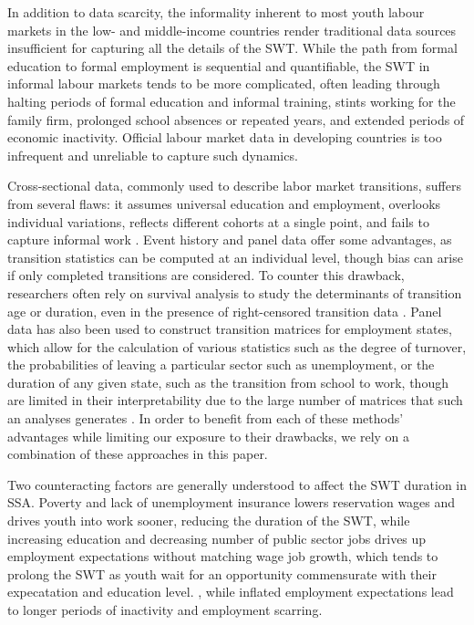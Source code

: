 \documentclass[
  a4paper, twoside, 12pt]{book}
\renewcommand{\hl}[1]{#1}
\newcommand{\hlc}[2][color]{}
\begin{document}
\hlc[pink]{The dynamic process of the school-to-work transition (SWT), including all the activities of young people between full-time schooling and stable employment, can only be fully captured with detailed, longitudinal data; as a result, most studies of SWT dynamics to date have been conducted in high-income countries (HICs).} In addition to data scarcity, the informality inherent to most youth labour markets in the low- and middle-income countries render traditional data sources insufficient for capturing all the details of the SWT. While the path from formal education to formal employment is sequential and quantifiable, the SWT in informal labour markets tends to be more complicated, often leading through halting periods of formal education and informal training, stints working for the family firm, prolonged school absences or repeated years, and extended periods of economic inactivity. Official labour market data in developing countries is too infrequent and unreliable to capture such dynamics.

\hl{Cross-sectional data, commonly used to describe labor market transitions, suffers from several flaws: it assumes universal education and employment, overlooks individual variations, reflects different cohorts at a single point, and fails to capture informal work} \autocite{nilsson2019}. \hl{Event history and panel data offer some advantages, as transition statistics can be computed at an individual level, though bias can arise if only completed transitions are considered. To counter this drawback, researchers often rely on survival analysis to study the determinants of transition age or duration, even in the presence of right-censored transition data} \autocite{nordman2015,manacorda2017}. \hl{Panel data has also been used to construct transition matrices for employment states, which allow for the calculation of various statistics such as the degree of turnover, the probabilities of leaving a particular sector such as unemployment, or the duration of any given state, such as the transition from school to work, though are limited in their interpretability due to the large number of matrices that such an analyses generates} \autocite{cunningham2011,bridges2017}. \hl{In order to benefit from each of these methods' advantages while limiting our exposure to their drawbacks, we rely on a combination of these approaches in this paper.}

\hl{Two counteracting factors are generally understood to affect the SWT duration in SSA. Poverty and lack of unemployment insurance lowers reservation wages and drives youth into work sooner, reducing the duration of the SWT, while increasing education and decreasing number of public sector jobs drives up employment expectations without matching wage job growth, which tends to prolong the SWT as youth wait for an opportunity commensurate with their expecatation and education level.} \hlc[lightgray]{Lower reservation wages and accelerated transitions lead to worse employment matches, as measured by the probability of attaining stable employment in the long run }\autocite{manacorda2017}, \hl{while inflated employment expectations lead to longer periods of inactivity and employment scarring.}
\end{document}

